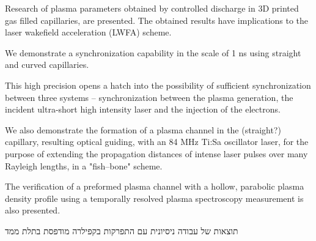 \documentclass[../main.tex]{subfiles}
\begin{document}
Research of plasma parameters obtained by controlled discharge in 3D printed gas filled capillaries, are presented. The obtained results have implications to the laser wakefield acceleration (LWFA) scheme.


We demonstrate a synchronization capability in the scale of 1 ns using straight and curved capillaries. 

This high precision opens a hatch into the possibility of sufficient synchronization between three systems -- synchronization between the plasma generation, the incident ultra-short high intensity laser and the injection of the electrons.

We also demonstrate the formation of a plasma channel in the (straight?) capillary, resulting optical guiding, with an 84 MHz Ti:Sa oscillator laser, for the purpose of extending the propagation distances of intense laser pulses over many Rayleigh lengths, in a "fish--bone" scheme.

The verification of a preformed plasma channel with a hollow, parabolic plasma density profile using a temporally resolved plasma spectroscopy measurement is also presented.


תוצאות של עבודה ניסיונית עם התפרקות בקפילרה מודפסת בתלת ממד
\end{document}
